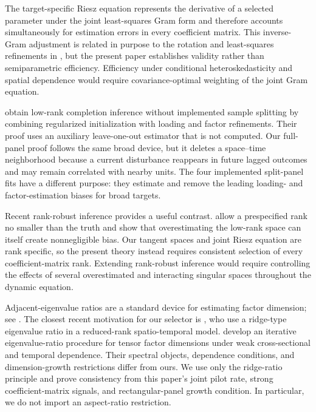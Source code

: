\documentclass[11pt]{article}
\numberwithin{equation}{section}
\theoremstyle{remark}
\begin{document}
The target-specific Riesz equation represents the derivative of a selected parameter under the joint least-squares Gram form and therefore accounts simultaneously for estimation errors in every coefficient matrix. This inverse-Gram adjustment is related in purpose to the rotation and least-squares refinements in \citet{chernozhukov2023}, but the present paper establishes validity rather than semiparametric efficiency. Efficiency under conditional heteroskedasticity and spatial dependence would require covariance-optimal weighting of the joint Gram equation.

\citet{choi2024} obtain low-rank completion inference without implemented sample splitting by combining regularized initialization with loading and factor refinements. Their proof uses an auxiliary leave-one-out estimator that is not computed. Our full-panel proof follows the same broad device, but it deletes a space--time neighborhood because a current disturbance reappears in future lagged outcomes and may remain correlated with nearby units. The four implemented split-panel fits have a different purpose: they estimate and remove the leading loading- and factor-estimation biases for broad targets.

Recent rank-robust inference provides a useful contrast. \citet{choi2026rank} allow a prespecified rank no smaller than the truth and show that overestimating the low-rank space can itself create nonnegligible bias. Our tangent spaces and joint Riesz equation are rank specific, so the present theory instead requires consistent selection of every coefficient-matrix rank. Extending rank-robust inference would require controlling the effects of several overestimated and interacting singular spaces throughout the dynamic equation.

Adjacent-eigenvalue ratios are a standard device for estimating factor dimension; see \citet{ahnhorenstein2013}. The closest recent motivation for our selector is \citet{puetal2025}, who use a ridge-type eigenvalue ratio in a reduced-rank spatio-temporal model. \citet{barigozzietal2026} develop an iterative eigenvalue-ratio procedure for tensor factor dimensions under weak cross-sectional and temporal dependence. Their spectral objects, dependence conditions, and dimension-growth restrictions differ from ours. We use only the ridge-ratio principle and prove consistency from this paper's joint pilot rate, strong coefficient-matrix signals, and rectangular-panel growth condition. In particular, we do not import an aspect-ratio restriction.
\end{document}
